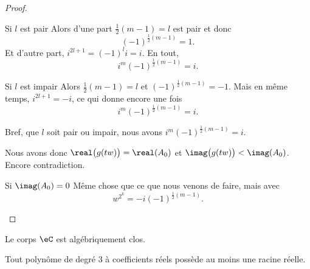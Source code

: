 \begin{proof}
\begin{subproof}
\begin{subproof}
\begin{subproof}
                        \item[Si \( l\) est pair]
                            Alors d'une part \( \frac{ 1 }{2}(m-1)=l\) est pair et donc 
                            \begin{equation}
                                (-1)^{\frac{ 1 }{2}(m-1)}=1.
                            \end{equation}
                            Et d'autre part, \( i^{2l+1}=(-1)^li=i\). En tout,
                            \begin{equation}
                                i^m(-1)^{\frac{ 1 }{2}(m-1)}=i.
                            \end{equation}
                        \item[Si \( l\) est impair]
                            Alors \( \frac{ 1 }{2}(m-1)=l\) et \( (-1)^{\frac{ 1 }{2}(m-1)}=-1\). Mais en même temps, \( i^{2l+1}=-i\), ce qui donne encore une fois
                            \begin{equation}
                                i^m(-1)^{\frac{ 1 }{2}(m-1)}=i.
                            \end{equation}
                    \end{subproof}
                    Bref, que \( l\) soit pair ou impair, nous avons \( i^m(-1)^{\frac{ 1 }{2}(m-1)}=i\).
            \end{subproof}
            Nous avons donc \( \real\big( g(tw) \big)=\real(A_0)\) et \( \imag\big( g(tw) \big)<\imag(A_0)\). Encore contradiction.
                \item[Si \( \imag(A_0)=0\)]
                    Même chose que ce que nous venons de faire, mais avec
                    \begin{equation}
                        w^{2^k}=-i(-1)^{\frac{ 1 }{2}(m-1)}.
                    \end{equation}
    \end{subproof}
\end{proof}

\begin{corollary}
    Le corps $\eC$ est algébriquement clos.
\end{corollary}

\begin{corollary}       \label{CORooKKNWooWEQukb}
    Tout polynôme de degré \( 3\) à coefficients réels possède au moins une racine réelle.
\end{corollary}

